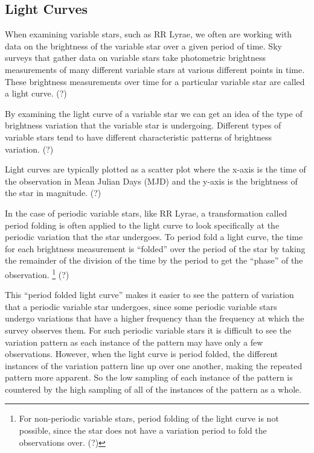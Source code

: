 \documentclass[]{article}
\begin{document}
\subsection{Light Curves}

When examining variable stars, such as RR Lyrae, we often are working with data on the brightness of the variable star over a given period of time. Sky surveys that gather data on variable stars take photometric brightness measurements of many different variable stars at various different points in time. These brightness measurements over time for a particular variable star are called a light curve. (?)

By examining the light curve of a variable star we can get an idea of the type of brightness variation that the variable star is undergoing. Different types of variable stars tend to have different characteristic patterns of brightness variation. (?)

Light curves are typically plotted as a scatter plot where the x-axis is the time of the observation in Mean Julian Days (MJD) and the y-axis is the brightness of the star in magnitude. (?)

In the case of periodic variable stars, like RR Lyrae, a transformation called period folding is often applied to the light curve to look specifically at the periodic variation that the star undergoes. To period fold a light curve, the time for each brightness measurement is “folded” over the period of the star by taking the remainder of the division of the time by the period to get the “phase” of the observation. \footnote{For non-periodic variable stars, period folding of the light curve is not possible, since the star does not have a variation period to fold the observations over. (?)} (?)

This “period folded light curve” makes it easier to see the pattern of variation that a periodic variable star undergoes, since some periodic variable stars undergo variations that have a higher frequency than the frequency at which the survey observes them. For such periodic variable stars it is difficult to see the variation pattern as each instance of the pattern may have only a few observations. However, when the light curve is period folded, the different instances of the variation pattern line up over one another, making the repeated pattern more apparent. So the low sampling of each instance of the pattern is countered by the high sampling of all of the instances of the pattern as a whole.
\end{document}
